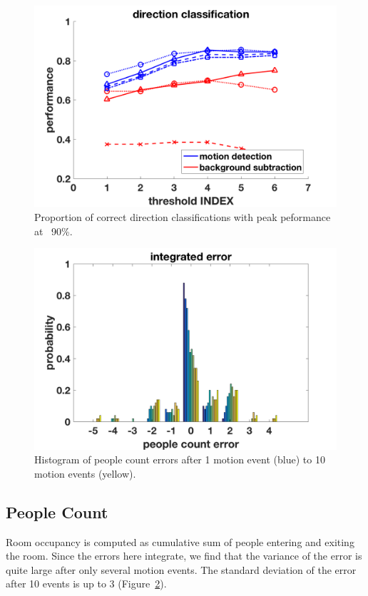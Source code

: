 \documentclass[12pt,oneside]{article} %
\begin{document}
\begin{figure}[!htb]
\centering
\includegraphics[scale=0.52]{images/dirClass.png}
\caption{Proportion of correct direction classifications with peak peformance at ~90\%.}
\label{dirclass}
\end{figure}

\begin{figure}[!htb]
\centering
\includegraphics[scale=0.52]{images/pcerror_gamma020_hist.png}
\caption{Histogram of people count errors after 1 motion event (blue) to 10 motion events (yellow).}
\label{hist}
\end{figure}

\clearpage
\subsection{People Count}
Room occupancy is computed as cumulative sum of people entering and exiting the room. Since the errors here
integrate, we find that the variance of the error is quite large after only several motion events.
The standard deviation of the error after 10 events is up to 3 (Figure~\ref{hist}).
\end{document}
